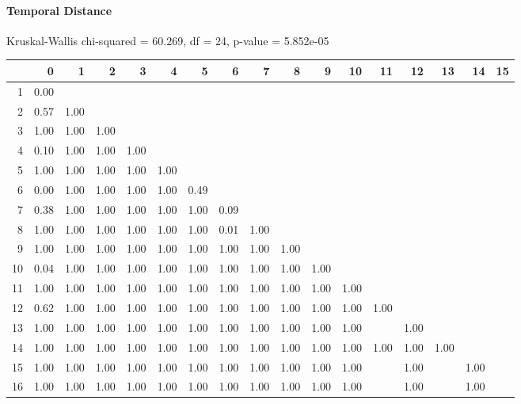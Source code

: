 \paragraph{Temporal Distance}
Kruskal-Wallis chi-squared = 60.269, df = 24, p-value = 5.852e-05

% 
\begin{tabular}{rrrrrrrrrrrrrrrrr}
  \hline
 & 0 & 1 & 2 & 3 & 4 & 5 & 6 & 7 & 8 & 9 & 10 & 11 & 12 & 13 & 14 & 15 \\ 
  \hline
1 & 0.00 &  &  &  &  &  &  &  &  &  &  &  &  &  &  &  \\ 
  2 & 0.57 & 1.00 &  &  &  &  &  &  &  &  &  &  &  &  &  &  \\ 
  3 & 1.00 & 1.00 & 1.00 &  &  &  &  &  &  &  &  &  &  &  &  &  \\ 
  4 & 0.10 & 1.00 & 1.00 & 1.00 &  &  &  &  &  &  &  &  &  &  &  &  \\ 
  5 & 1.00 & 1.00 & 1.00 & 1.00 & 1.00 &  &  &  &  &  &  &  &  &  &  &  \\ 
  6 & 0.00 & 1.00 & 1.00 & 1.00 & 1.00 & 0.49 &  &  &  &  &  &  &  &  &  &  \\ 
  7 & 0.38 & 1.00 & 1.00 & 1.00 & 1.00 & 1.00 & 0.09 &  &  &  &  &  &  &  &  &  \\ 
  8 & 1.00 & 1.00 & 1.00 & 1.00 & 1.00 & 1.00 & 0.01 & 1.00 &  &  &  &  &  &  &  &  \\ 
  9 & 1.00 & 1.00 & 1.00 & 1.00 & 1.00 & 1.00 & 1.00 & 1.00 & 1.00 &  &  &  &  &  &  &  \\ 
  10 & 0.04 & 1.00 & 1.00 & 1.00 & 1.00 & 1.00 & 1.00 & 1.00 & 1.00 & 1.00 &  &  &  &  &  &  \\ 
  11 & 1.00 & 1.00 & 1.00 & 1.00 & 1.00 & 1.00 & 1.00 & 1.00 & 1.00 & 1.00 & 1.00 &  &  &  &  &  \\ 
  12 & 0.62 & 1.00 & 1.00 & 1.00 & 1.00 & 1.00 & 1.00 & 1.00 & 1.00 & 1.00 & 1.00 & 1.00 &  &  &  &  \\ 
  13 & 1.00 & 1.00 & 1.00 & 1.00 & 1.00 & 1.00 & 1.00 & 1.00 & 1.00 & 1.00 & 1.00 &  & 1.00 &  &  &  \\ 
  14 & 1.00 & 1.00 & 1.00 & 1.00 & 1.00 & 1.00 & 1.00 & 1.00 & 1.00 & 1.00 & 1.00 & 1.00 & 1.00 & 1.00 &  &  \\ 
  15 & 1.00 & 1.00 & 1.00 & 1.00 & 1.00 & 1.00 & 1.00 & 1.00 & 1.00 & 1.00 & 1.00 &  & 1.00 &  & 1.00 &  \\ 
  16 & 1.00 & 1.00 & 1.00 & 1.00 & 1.00 & 1.00 & 1.00 & 1.00 & 1.00 & 1.00 & 1.00 &  & 1.00 &  & 1.00 &  \\ 
   \hline
\end{tabular}
